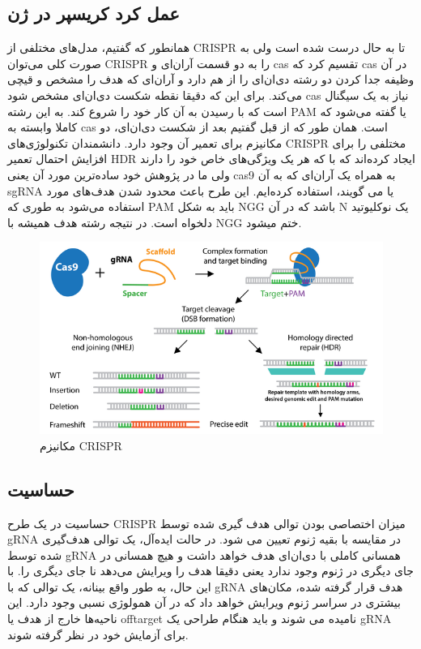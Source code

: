 \documentclass[12pt,a4paper,BCOR=.7cm,headsepline,bibliography=totoc]{report}
\begin{document}
\subsection{عمل کرد کریسپر در ژن}
همانطور که گفتیم، مدل‌های مختلفی از CRISPR تا به حال درست شده است ولی به صورت کلی می‌توان CRISPR را به دو قسمت آر‌ان‌ای و  cas تقسیم کرد که cas در آن وظیفه جدا کردن دو رشته دی‌ان‌ای را از هم دارد و آر‌ان‌ای که هدف را مشخص و قیچی می‌کند. برای این که دقیقا نقطه شکست دی‌ان‌ای مشخص شود cas نیاز به یک سیگنال است که با رسیدن به آن کار خود را شروع کند. به این رشته PAM یا 
گفته می‌شود که کاملا وابسته به cas است. همان طور که از قبل گفتیم بعد از شکست دی‌ان‌ای، دو مکانیزم برای تعمیر آن وجود دارد. دانشمندان تکنولوژی‌های CRISPR مختلفی را برای افزایش احتمال تعمیر HDR ایجاد کرده‌اند که با که هر یک ویژگی‌های خاص خود را دارند ولی ما در پژوهش خود ساده‌ترین مورد آن یعنی cas9 به همراه یک آر‌ان‌ای که به آن sgRNA یا 
می گویند، استفاده کرده‌ایم. این طرح باعث محدود شدن هدف‌های مورد استفاده می‌شود به طوری که ‌PAM باید به شکل NGG باشد که در آن N یک نوکلیوتید دلخواه است. در نتیجه رشته هدف همیشه با NGG ختم میشود. 
\begin{figure}[!h]
\centering
\includegraphics[width=12cm, ]{pictures/cut.png}
\caption{
مکانیزم CRISPR \cite{addgene}
}\label{fig:2}
\end{figure}
 
\subsection{حساسیت}
حساسیت در یک طرح CRISPR میزان اختصاصی بودن توالی هدف گیری شده توسط gRNA در مقایسه با بقیه ژنوم تعیین می شود. در حالت ایده‌آل، یک توالی هدف‌گیری شده توسط gRNA همسانی کاملی با دی‌ان‌ای هدف خواهد داشت و هیچ همسانی در جای دیگری در ژنوم وجود ندارد یعنی دقیقا هدف را ویرایش می‌دهد نا جای دیگری را. با این حال، به طور واقع بینانه، یک توالی که با gRNA هدف قرار گرفته شده، مکان‌های بیشتری در سراسر ژنوم ویرایش خواهد داد که در آن همولوژی نسبی وجود دارد. این ناحیه‌ها خارج از هدف یا offtarget نامیده می شوند و باید هنگام طراحی یک gRNA برای آزمایش خود در نظر گرفته شوند.
\end{document}
